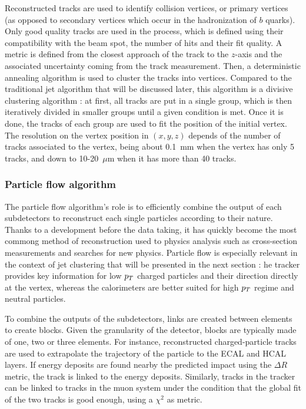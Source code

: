         Reconstructed tracks are used to identify collision vertices, or primary vertices
        (as opposed to secondary vertices which occur in the hadronization of $b$ quarks).
        Only good quality tracks are used in the process, which is defined using their
        compatibility with the beam spot, the number of hits and their fit quality. A
        metric is defined from the closest approach of the track to the $z$-axis and
        the associated uncertainty coming from the track measurement. Then, a deterministic
        annealing algorithm is used to cluster the tracks into vertices. Compared to the
        traditional jet algorithm that will be discussed later, this algorithm is a divisive
        clustering algorithm : at first, all tracks are put in a single group, which is then
        iteratively divided in smaller groups until a given condition is met. Once it is
        done, the tracks of each group are used to fit the position of the initial vertex.
        The resolution on the vertex position in $(x,y,z)$ depends of the number of tracks
        associated to the vertex, being about 0.1~mm when the vertex has only 5 tracks, and
        down to 10-20~$\mu$m when it has more than 40 tracks.

            \subsubsection{Particle flow algorithm}


        The particle flow algorithm's role is to efficiently combine the output of each
        subdetectors to reconstruct each single particles according to their nature. Thanks
        to a development before the data taking, it has quickly become the most commong
        method of reconstruction used to physics analysis such as cross-section measurements
        and searches for new physics. Particle flow is especially relevant in the context
        of jet clustering that will be presented in the next section : he tracker provides
        key information for low $p_T$ charged particles and their direction directly at the
        vertex, whereas the calorimeters are better suited for high $p_T$ regime and neutral
        particles.

        To combine the outputs of the subdetectors, links are created between elements
        to create blocks. Given the granularity of the detector, blocks are typically made
        of one, two or three elements. For instance, reconstructed charged-particle tracks
        are used to extrapolate the trajectory of the particle to the ECAL and HCAL layers.
        If energy deposits are found nearby the predicted impact using the $\Delta R$
        metric, the track is linked to the energy deposits. Similarly, tracks in the
        tracker can be linked to tracks in the muon system under the condition that the
        global fit of the two tracks is good enough, using a $\chi^2$ as metric.

